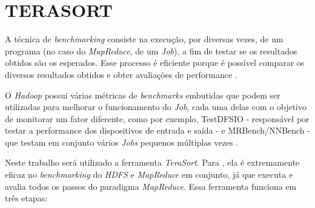 \newpage
\section{TERASORT} \label{sec:terasort}

A técnica de \textit{\gls{benchmark}ing} consiste na execução, por diversas vezes, de um programa (no caso do \textit{MapReduce}, de um \textit{Job}), a fim de testar se os resultados obtidos são os esperados. Esse processo é eficiente porque é possível comparar os diversos resultados obtidos e obter avaliações de performance \cite{HadoopBook15}.

O \textit{Hadoop} possui várias métricas de \textit{\gls{benchmark}s} embutidas que podem ser utilizadas para melhorar o funcionamento do \textit{Job}, cada uma delas com o objetivo de monitorar um fator diferente, como por exemplo, TestDFSIO  - responsável por testar a performance dos dispositivos de entrada e saída - e MRBench/NNBench - que testam em conjunto vários \textit{Jobs} pequenos múltiplas vezes \cite{HadoopBook15}.

Neste trabalho será utilizado a ferramenta \textit{TeraSort}. Para \textcite{HadoopBook15}, ela é extremamente eficaz no \textit{\gls{benchmark}ing} do \textit{HDFS} e \textit{MapReduce} em conjunto, já que executa e avalia todos os passos do paradigma \textit{MapReduce}. Essa ferramenta funciona em três etapas:

